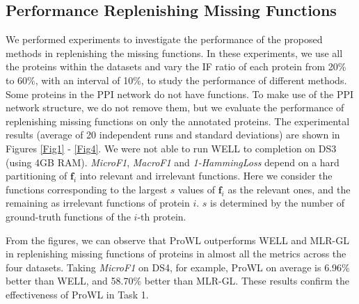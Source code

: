 \documentclass{llncs} %
\begin{document}
\subsection{Performance Replenishing Missing Functions}
We performed experiments to investigate the performance of the proposed methods in
replenishing the missing functions. In these experiments, we use all the proteins within the datasets and vary the IF ratio of each protein
from 20\% to 60\%, with an interval of 10\%, to study the performance of different methods. Some
proteins in the PPI network do not have functions.  To make use of the PPI network structure, we do not remove them, but
we evaluate the performance of replenishing missing functions on only
the annotated proteins. The experimental results (average
of 20 independent runs and standard deviations)  are shown in
Figures \ref{Fig1} - \ref{Fig4}. We were not able to run WELL to
completion  on DS3 (using 4GB RAM).  \emph{MicroF1}, \emph{MacroF1} and \emph{1-HammingLoss} depend
on a hard partitioning of $\mathbf{f}_i$ into relevant and irrelevant
functions. Here we consider the functions corresponding to the largest $s$ values of $\mathbf{f}_i$ as the relevant ones, and the remaining as irrelevant functions of protein $i$. $s$ is determined by the number of ground-truth functions of the $i$-th protein.

From the figures, we can observe that ProWL outperforms
WELL and MLR-GL in replenishing missing functions of proteins in almost
all the metrics across the four datasets. Taking \emph{MicroF1} on DS4, for example,
ProWL on average is 6.96\% better than WELL, and 58.70\% better than MLR-GL. These results confirm the effectiveness of ProWL in Task 1.
\end{document}
